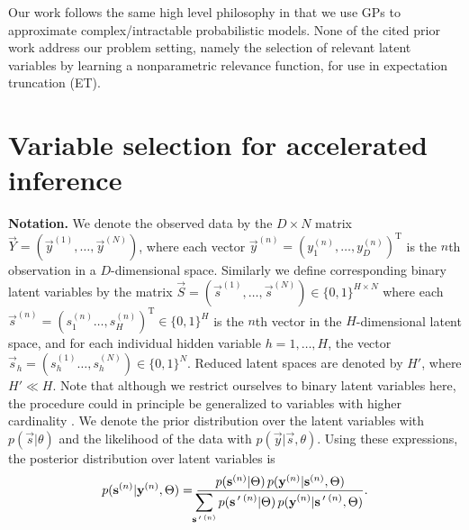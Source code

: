 Our work follows the same high level philosophy in that we use GPs to approximate complex/intractable probabilistic models. None of the cited prior work address our problem setting, namely the selection of relevant latent variables by learning a nonparametric relevance function, for use in expectation truncation (ET).

\section{Variable selection for accelerated inference}
\label{method}
%
\textbf{Notation.}
We denote the observed data by the $D\times N$ matrix $\vec{Y}=(\vec{y}^{(1)}, \dots, \vec{y}^{(N)})$, where each vector $\vec{y}^{(n)} = ( y_1^{(n)}, \dots, y_D^{(n)})^\mathrm{T}$ is the $n$th observation 
in a $D$-dimensional space.
Similarly we define corresponding 
binary latent variables 
by the matrix $\vec{S} = (\vec{s}^{(1)}, \dots, \vec{s}^{(N)})\in \{0,1\}^{H \times N}$ 
where each $\vec{s}^{(n)}=(s_1^{(n)}\dots, s^{(n)}_H)^\mathrm{T} \in \{0,1\}^{H}$ is the $n$th vector in the $H$-dimensional latent space,
and for each individual hidden variable $h=1,\dots,H$, the vector $\vec{s}_h=(s_h^{(1)}\dots, s^{(N)}_h)\in \{0,1\}^{N}$. 
Reduced latent spaces are denoted by $H'$, where $H' \ll H$. 
Note that although we restrict ourselves to binary latent variables here, 
the procedure could in principle be generalized to variables with higher cardinality \citep[e.g. see]{ExarchakisEtAl2012}.
We denote the prior distribution over the latent variables with $p(\vec{s} | \theta)$ 
and the likelihood of the data with $p(\vec{y} | \vec{s}, \theta)$.
Using these expressions, the posterior distribution over latent variables is 
%
\vspace{-.1cm}
\begin{equation}
\label{eq:post}
p({\mathbf{s}}^{(n)}|{\mathbf{y}}^{(n)},\Theta)  = \frac{p({\mathbf{s}}^{(n)} | \Theta) \, p({\mathbf{y}}^{(n)} | {\mathbf{s}}^{(n)}, \Theta)}
{\displaystyle\hspace{-1.5mm}\sum_{{\mathbf{s}}\,'\,^{(n)}} p({\mathbf{s}}\,'\,^{(n)} | \Theta) \, p({\mathbf{y}}^{(n)} | {\mathbf{s}}\,'\,^{(n)}, \Theta)}.
\end{equation}
\vspace{-.5cm}

